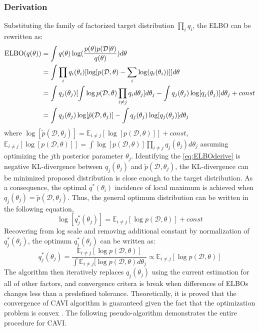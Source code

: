\subsubsection{Derivation}
Substituting the family of factorized target distribution $\prod_i q_i$, the ELBO can be rewritten as:
\begin{equation}
	\label{eq:ELBOderive}	
	\begin{aligned}
		\textnormal{ELBO}(q(\theta)) &= \int q(\theta)\log(\frac{p(\theta)p(\mathcal{D}|\theta)}{q(\theta)})d\theta \\
		&= \int \prod_i q_i(\theta_i) [\log[p(\mathcal{D},\theta) - \sum_i \log(q_i(\theta_i))]]d\theta \\
		&= \int q_j(\theta_j)[\int \log p(\mathcal{D},\theta) \prod_{i\neq j}q_i d\theta_j]d\theta_j - \int q_j(\theta_j) \log[q_j(\theta_j)]d\theta_j + const\\
		&= \int q_j(\theta_j) \log[\tilde{p}(\mathcal{D},\theta_j)] - \int q_j(\theta_j) \log[q_j(\theta_j)]d\theta_j
	\end{aligned}
\end{equation}
where $\log[\tilde{p}(\mathcal{D},\theta_j)] = \mathbb{E}_{i \neq j}[\log[p(\mathcal{D},\theta)]] + const$,\\ $\mathbb{E}_{i\neq j}[\log[p(\mathcal{D},\theta)]] = \int \log[p(\mathcal{D},\theta)]\prod_{i\neq j}q_j(\theta_j)d\theta_j$ assuming optimizing the $j$th posterior parameter $\theta_j$.
Identifying the \ref{eq:ELBOderive} is negative KL-divergence between $q_j(\theta_j) $ and $\tilde{p}(\mathcal{D},\theta_j)$, the KL-divergence can be minimized proposed distribution is close enough to the target distribution. As a consequence, the optimal $q^{*}(\theta_i)$ incidence of local maximum is achieved when $q_j(\theta_j) = \tilde{p}(\mathcal{D},\theta_j)$. Thus, the general optimum distribution can be written in the following equation,
\begin{equation}
	\label{eq:logoptimumQ}
	\log[q_j^*(\theta_j)] = \mathbb{E}_{i\neq j}[\log p(\mathcal{D},\theta)] + const
\end{equation}
Recovering from log scale and removing additional constant by normalization of $q_j^*(\theta_j)$, the optimum $q_j^*(\theta_j)$ can be written as:
\begin{equation}
	\label{eq:optimalSolution}
	q_j^*(\theta_j) = \frac{\mathbb{E}_{i\neq j}[\log p(\mathcal{D},\theta)]}{\int \mathbb{E}_{i\neq j}[\log p(\mathcal{D},\theta)d\theta_j} \propto \mathbb{E}_{i\neq j}[\log p(\mathcal{D},\theta)]
\end{equation}
The algorithm then iteratively replaces $q_j(\theta_j)$ using the current estimation for all of other factors, and convergence critera is break when differences of ELBOs changes less than a predefined tolerance. Theoretically, it is proved that the convergence of CAVI algorithm is guaranteed given the fact that the optimization problem is convex \cite{boyd2004convex}. The following pseudo-algorithm demonstrates the entire procedure for CAVI.

